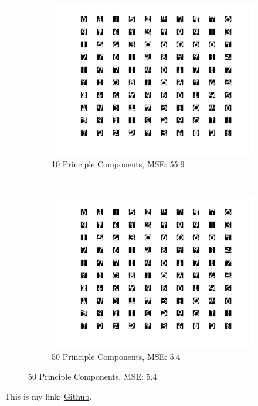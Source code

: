 \documentclass{article}
\begin{document}
\begin{figure}[t!]
    \centering
    \begin{subfigure}{0.45\textwidth}
        \centering
        \includegraphics[width=\textwidth]{../pca_100.png}
        \caption{10 Principle Components, MSE: 55.9}
    \end{subfigure}%
    ~
    \begin{subfigure}{0.45\textwidth}
        \centering
        \includegraphics[width=\textwidth]{../pca_200.png}
        \caption{50 Principle Components, MSE: 5.4}
    \end{subfigure}
\end{figure}
This is my link: \href{https://github.com/XitongZhang1994/ML_HW5.git}{Github}.
\end{document}
